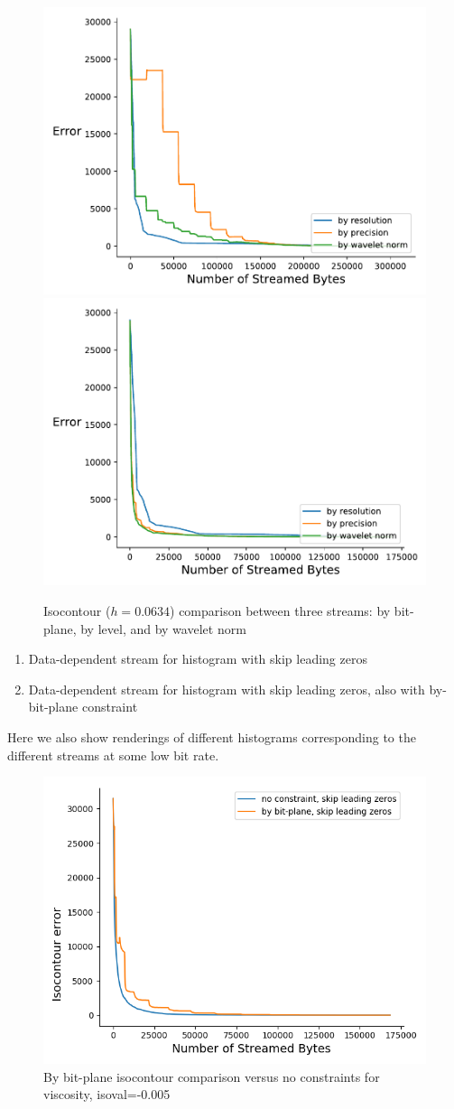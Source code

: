 \begin{figure}[htb!]
	\centering
	{\includegraphics[width=0.4\linewidth]{img/independent/isocontour-miranda-viscosity}}
	{\includegraphics[width=0.4\linewidth]{img/skip-zeros/isocontour-miranda-viscosity}}
	\caption {Isocontour ($h = 0.0634$) comparison between three streams: by bit-plane, by level, and by wavelet norm}
	\label{fig:isocontour_traditional_vs_by_norm_viscosity}
\end{figure}




\begin{enumerate}
  \item Data-dependent stream for histogram with skip leading zeros
  \item Data-dependent stream for histogram with skip leading zeros, also with by-bit-plane constraint
\end{enumerate}  
  Here we also show renderings of different histograms corresponding to the different streams at some low bit rate.

\begin{figure}
  \centering
  \includegraphics[width=0.8\linewidth]{resources/isocontour-error-by-bit-plane-viscosity.png}
  \caption {By bit-plane isocontour comparison versus no constraints for viscosity, isoval=-0.005}
  \label{fig:by_bit_plane_isocontour}
\end{figure}
